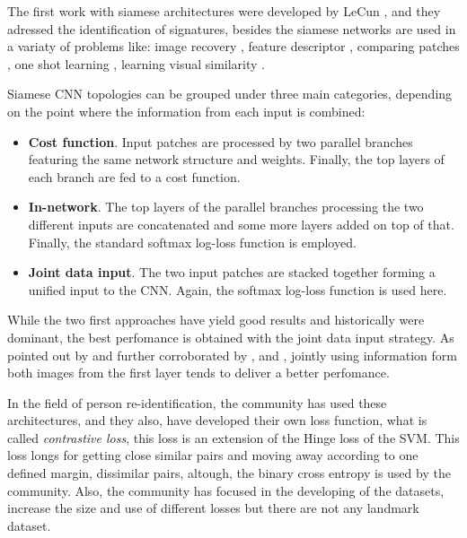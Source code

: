 \documentclass[12pt, a4paper, titlepage,twoside,openright]{article}
\begin{document}
The first work with siamese architectures were developed by LeCun \cite{siamLecun}, \cite{siameLecun2} and they adressed the identification of signatures, besides the siamese networks are used in a variaty of problems like: image recovery \cite{siameseQuer}, feature descriptor \cite{siameDescri}, comparing patches \cite{patch1}, one shot learning \cite{siameseOne}, learning visual similarity \cite{siamesSImi}. 

Siamese CNN topologies can be grouped under three main categories, depending on the point where the information from each input is combined:

\begin{itemize}

\item \textbf{Cost function}. Input patches are processed by two parallel branches featuring the same network structure and weights. Finally, the top layers of each branch are fed to a cost function.

\item \textbf{In-network}. The top layers of the parallel branches processing the two different inputs are concatenated and some more layers added on top of that. Finally, the standard softmax log-loss function is employed.

\item \textbf{Joint data input}. The two input patches are stacked together forming a unified input to the CNN. Again, the softmax log-loss function is used here.

\end{itemize}

While the two first approaches have yield good results and historically were dominant, the best perfomance is obtained with the joint data input strategy. As pointed out by  \cite{patch1} and further corroborated by \cite{patch2}, and \cite{patch3}, jointly using information form both images from the first layer tends to deliver a better perfomance. 


In the field of person re-identification, the community has used these architectures, and they also, have developed their own loss function, what is called \textit{contrastive loss}, this loss is an extension of the Hinge loss of the SVM. This loss longs for getting close similar pairs and moving away according to one defined margin, dissimilar pairs, altough, the binary cross entropy is used by the community. Also, the community has focused in the developing of the datasets, increase the size and use of different losses but there are not any landmark dataset.
\end{document}
